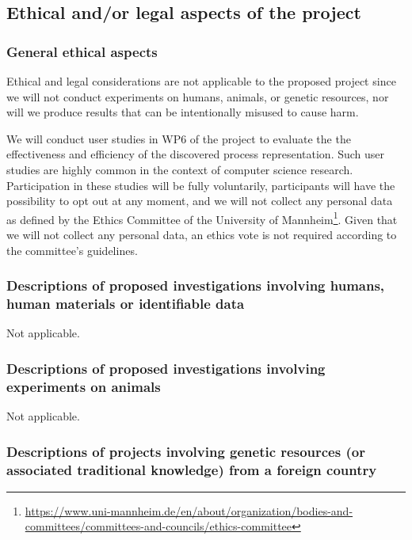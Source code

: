 
 \subsection{Ethical and/or legal aspects of the project}
 \label{sec:ethical}

\subsubsection{General ethical aspects}

Ethical and legal considerations are not applicable to the proposed project since we 
will not conduct experiments on humans, animals, or genetic resources, nor will we  produce results that can be intentionally misused to cause harm. 

We will conduct user studies in WP6 of the project to evaluate the the effectiveness and efficiency of the discovered process representation. Such user studies are highly common in the context of computer science research. Participation in these studies will be fully voluntarily, participants will have the possibility to opt out at any moment, and we will not collect any personal data as defined by the Ethics Committee of the University of Mannheim\footnote{\url{https://www.uni-mannheim.de/en/about/organization/bodies-and-committees/committees-and-councils/ethics-committee}}. Given that we will not collect any personal data, an ethics vote is not required according to the committee's guidelines. 

\subsubsection{Descriptions of proposed investigations involving humans, human materials or identifiable data}

Not applicable.

\subsubsection{Descriptions of proposed investigations involving experiments on animals}

Not applicable.

\subsubsection{Descriptions of projects involving genetic resources (or associated traditional knowledge) from a foreign country}

